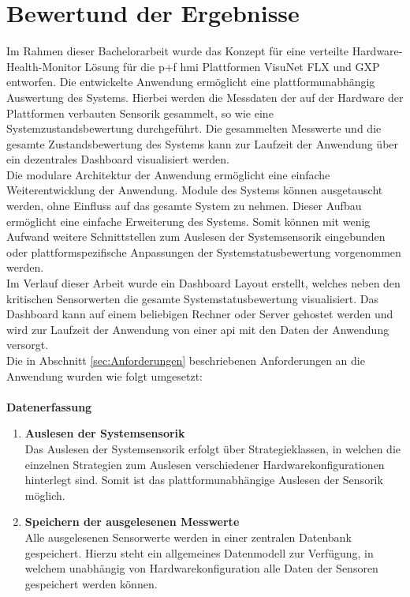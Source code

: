 \chapter{Bewertund der Ergebnisse}
Im Rahmen dieser Bachelorarbeit wurde das Konzept für eine verteilte Hardware-Health-Monitor Lösung für die \acl{p+f} \ac{hmi} Plattformen VisuNet FLX und GXP entworfen. Die entwickelte Anwendung ermöglicht eine plattformunabhängig Auswertung des Systems. Hierbei werden die Messdaten der auf der Hardware der Plattformen verbauten Sensorik gesammelt, so wie eine Systemzustandsbewertung durchgeführt. Die gesammelten Messwerte und die gesamte Zustandsbewertung des Systems kann zur Laufzeit der Anwendung über ein dezentrales Dashboard visualisiert werden.\\
Die modulare Architektur der Anwendung ermöglicht eine einfache Weiterentwicklung der Anwendung. Module des Systems können ausgetauscht werden, ohne Einfluss auf das gesamte System zu nehmen. Dieser Aufbau ermöglicht eine einfache Erweiterung des Systems. Somit können mit wenig Aufwand weitere Schnittstellen zum Auslesen der Systemsensorik eingebunden oder plattformspezifische Anpassungen der Systemstatusbewertung vorgenommen werden.\\
Im Verlauf dieser Arbeit wurde ein Dashboard Layout erstellt, welches neben den kritischen Sensorwerten die gesamte Systemstatusbewertung visualisiert. Das Dashboard kann auf einem beliebigen Rechner oder Server gehostet werden und wird zur Laufzeit der Anwendung von einer \ac{api} mit den Daten der Anwendung versorgt.\\
Die in Abschnitt \ref{sec:Anforderungen} beschriebenen Anforderungen an die Anwendung wurden wie folgt umgesetzt:\\
\\
\vspace{0.5cm}
\textbf{Datenerfassung}
\begin{enumerate}
    \item \textbf{Auslesen der Systemsensorik}\\
    Das Auslesen der Systemsensorik erfolgt über Strategieklassen, in welchen die einzelnen Strategien zum Auslesen verschiedener Hardwarekonfigurationen hinterlegt sind. Somit ist das plattformunabhängige Auslesen der Sensorik möglich. 
    \item \textbf{Speichern der ausgelesenen Messwerte}\\
    Alle ausgelesenen Sensorwerte werden in einer zentralen Datenbank gespeichert. Hierzu steht ein allgemeines Datenmodell zur Verfügung, in welchem unabhängig von Hardwarekonfiguration alle Daten der Sensoren gespeichert werden können.
\end{enumerate}

